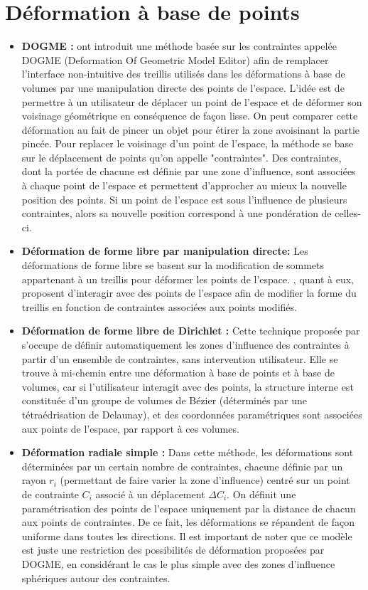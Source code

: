 \section{Déformation à base de points}
\begin{itemize}
\item{\textbf{DOGME :}} \cite{BB91} ont introduit une méthode basée
  sur les contraintes appelée DOGME (Deformation Of Geometric Model
  Editor) afin de remplacer l'interface non-intuitive des treillis
  utilisés dans les déformations à base de volumes par une
  manipulation directe des points de l'espace. L'idée est de permettre
  à un utilisateur de déplacer un point de l'espace et de déformer son
  voisinage géométrique en conséquence de façon lisse. On peut
  comparer cette déformation au fait de pincer un objet pour étirer la
  zone avoisinant la partie pincée. Pour replacer le voisinage d'un
  point de l'espace, la méthode se base sur le déplacement de points
  qu'on appelle "contraintes". Des contraintes, dont la portée de
  chacune est définie par une zone d'influence, sont associées à
  chaque point de l'espace et permettent d'approcher au mieux la
  nouvelle position des points. Si un point de l'espace est sous
  l'influence de plusieurs contraintes, alors sa nouvelle position
  correspond à une pondération de celles-ci.
\item{\textbf{Déformation de forme libre par manipulation directe:}}
  Les déformations de forme libre se basent sur la modification de
  sommets appartenant à un treillis pour déformer les points de
  l'espace. \cite{HHK92}, quant à eux, proposent d'interagir avec des
  points de l'espace afin de modifier la forme du treillis en fonction
  de contraintes associées aux points modifiés.
\item{\textbf{Déformation de forme libre de Dirichlet :}} Cette
  technique proposée par \cite{MT97} s'occupe de définir
  automatiquement les zones d'influence des contraintes à partir d'un
  ensemble de contraintes, sans intervention utilisateur. Elle se
  trouve à mi-chemin entre une déformation à base de points et à base
  de volumes, car si l'utilisateur interagit avec des points, la
  structure interne est constituée d'un groupe de volumes de Bézier
  (déterminés par une tétraédrisation de Delaunay), et des coordonnées
  paramétriques sont associées aux points de l'espace, par rapport à
  ces volumes.
\item{\textbf{Déformation radiale simple :}} Dans cette méthode, les
  déformations sont déterminées par un certain nombre de contraintes,
  chacune définie par un rayon $r_i$ (permettant de faire varier la
  zone d'influence) centré sur un point de contrainte $C_i$ associé à
  un déplacement $\Delta C_i$. On définit une paramétrisation des
  points de l'espace uniquement par la distance de chacun aux points de
  contraintes. De ce fait, les déformations se répandent de façon
  uniforme dans toutes les directions. Il est important de noter que
  ce modèle est juste une restriction des possibilités de déformation
  proposées par DOGME, en considérant le cas le plus simple avec des
  zones d'influence sphériques autour des contraintes.
\end{itemize}

